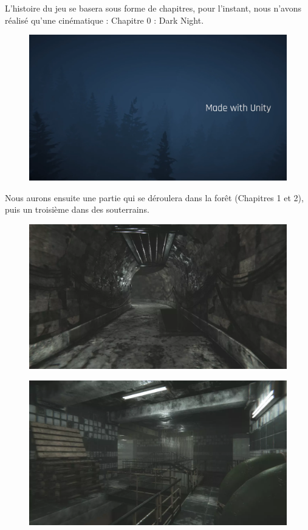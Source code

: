 L'histoire du jeu se basera sous forme de chapitres, pour l'instant, nous n'avons réalisé qu'une cinématique : Chapitre 0 : Dark Night.
\newline

\begin{figure}[H]
\centering
\begin{minipage}{.5\textwidth}
  \centering
  \centerline{\includegraphics[width=1\linewidth]{img/cine.png}}
  \label{fig:cinematique}
\end{minipage}%
\end{figure}

Nous aurons ensuite une partie qui se déroulera dans la forêt (Chapitres 1 et 2), puis un troisième dans des souterrains.
\newline

\begin{figure}[H]
\centering
\begin{minipage}{.5\textwidth}
  \centering
  \includegraphics[width=.7\linewidth]{img/assets/egouts1.png}
  \label{fig:égouts1}
\end{minipage}%
\begin{minipage}{.5\textwidth}
  \centering
  \includegraphics[width=.7\linewidth]{img/assets/egouts2.png}
  \label{fig:égouts2}
\end{minipage}
\end{figure}

